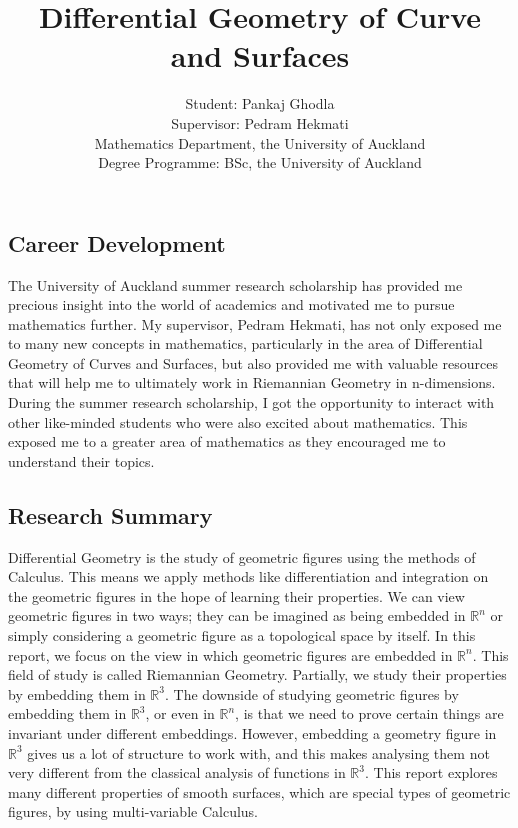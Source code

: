 \documentclass{article}
\title{ \textbf{ Differential Geometry of Curve and Surfaces}}
\author{Student: Pankaj Ghodla \\ {Supervisor: Pedram Hekmati} \\ {Mathematics Department, the University of Auckland} \\ Degree Programme: BSc, the University of Auckland}
\date{}
\theoremstyle{plain}
\theoremstyle{definition}
\theoremstyle{remark}
\newcommand{\R}{\mathbb{R}}
\begin{document}
\maketitle

\subsection*{Career Development}

The University of Auckland summer research scholarship has provided me precious insight into the world of academics and motivated me to pursue mathematics further. My supervisor, Pedram Hekmati, has not only exposed me to many new concepts in mathematics, particularly in the area of Differential Geometry of Curves and Surfaces, but also provided me with valuable resources that will help me to ultimately work in Riemannian Geometry in n-dimensions. During the summer research scholarship, I got the opportunity to interact with other like-minded students who were also excited about mathematics. This exposed me to a greater area of mathematics as they encouraged me to understand their topics. 

\subsection*{Research Summary}
Differential Geometry is the study of geometric figures using the methods of Calculus. This means we apply methods like differentiation and integration on the geometric figures in the hope of learning their properties. We can view geometric figures in two ways; they can be imagined as being embedded in \(\R^n\) or simply considering a geometric figure as a topological space by itself. In this report, we focus on the view in which geometric figures are embedded in \( \R^n \). This field of study is called Riemannian Geometry. Partially, we study their properties by embedding them in \( \R^3 \). The downside of studying geometric figures by embedding them in \( \R^3 \), or even in \( \R^n \), is that we need to prove certain things are invariant under different embeddings. However, embedding a geometry figure in \( \R^3 \) gives us a lot of structure to work with, and this makes analysing them not very different from the classical analysis of functions in \(\R^3\). This report explores many different properties of smooth surfaces, which are special types of geometric figures, by using multi-variable Calculus.
\end{document}
